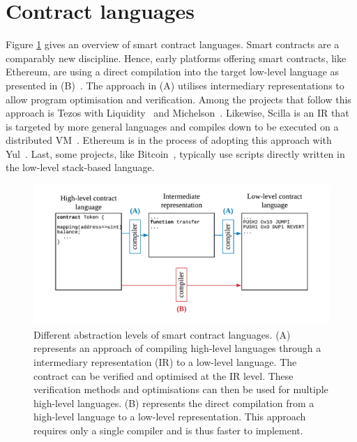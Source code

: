 \section{Contract languages}
\label{languages}

Figure \ref{fig:languagediagram} gives an overview of smart contract languages.
Smart contracts are a comparably new discipline.
Hence, early platforms offering smart contracts, like Ethereum, are using a direct compilation into the target low-level language as presented in (B)~\cite{Ethereum2018Vyper}.
The approach in (A) utilises intermediary representations to allow program optimisation and verification. 
Among the projects that follow this approach is Tezos with Liquidity~\cite{OCamlProSAS2018} and Michelson~\cite{DynamicLedgerSolutions2017}. 
Likewise, Scilla is an IR that is targeted by more general languages and compiles down to be executed on a distributed VM~\cite{Sergey2018}.
Ethereum is in the process of adopting this approach with Yul~\cite{EthereumFoundation2018IULIA}.
Last, some projects, like Bitcoin~\cite{BitcoinWiki2018Script}, typically use scripts directly written in the low-level stack-based language.




\begin{figure}[!t]
\normalsize
\centering
\includegraphics[width=\columnwidth]{fig/Language.pdf}
\caption{Different abstraction levels of smart contract languages. (A) represents an approach of compiling high-level languages through a intermediary representation (IR) to a low-level language. The contract can be verified and optimised at the IR level. These verification methods and optimisations can then be used for multiple high-level languages. (B) represents the direct compilation from a high-level language to a low-level representation. This approach requires only a single compiler and is thus faster to implement.}
\label{fig:languagediagram}
\end{figure}


